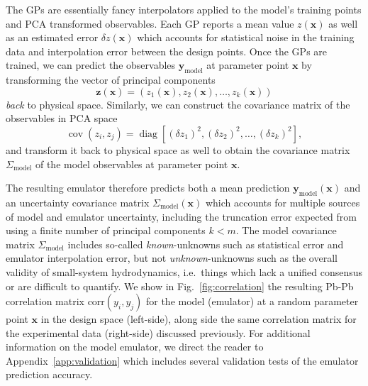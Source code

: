 \documentclass[aps,prc,reprint,amsmath,nofootinbib]{revtex4-1}
\newcommand{\xv}{\mathbf x}
\newcommand{\ym}{{\mathbf y}_\text{model}}
\newcommand{\Sigmam}{\Sigma_\text{model}}
\DeclareMathOperator{\diag}{diag}
\DeclareMathOperator{\cov}{cov}
\begin{document}
The GPs are essentially fancy interpolators applied to the model's training points and PCA transformed observables.
Each GP reports a mean value $z(\xv)$ as well as an estimated error $\delta z(\xv)$ which accounts for statistical noise in the training data and interpolation error between the design points.
Once the GPs are trained, we can predict the observables $\ym$ at parameter point $\xv$ by transforming the vector of principal components
\begin{equation}
  \mathbf{z}(\xv) = (z_1(\xv), z_2(\xv), \dots, z_k(\xv))
\end{equation}
\emph{back} to physical space.
Similarly, we can construct the covariance matrix of the observables in PCA space
\begin{equation}
  \cov(z_i, z_j) = \diag[(\delta z_{1})^2, (\delta z_2)^2, \dots, (\delta z_k)^2 ],
\end{equation}
and transform it back to physical space as well to obtain the covariance matrix $\Sigmam$ of the model observables at parameter point $\xv$.

The resulting emulator therefore predicts both a mean prediction $\ym(\xv)$ and an uncertainty covariance matrix $\Sigmam(\xv)$ which accounts for multiple sources of model and emulator uncertainty, including the truncation error expected from using a finite number of principal components $k < m$.
The model covariance matrix $\Sigmam$ includes so-called \emph{known}-unknowns such as statistical error and emulator interpolation error, but not \emph{unknown}-unknowns such as the overall validity of small-system hydrodynamics, i.e.\ things which lack a unified consensus or are difficult to quantify.
We show in Fig.~\ref{fig:correlation} the resulting Pb-Pb correlation matrix $\mathrm{corr}(y_i,y_j)$ for the model (emulator) at a random parameter point $\xv$ in the design space (left-side), along side the same correlation matrix for the experimental data (right-side) discussed previously.
For additional information on the model emulator, we direct the reader to Appendix~\ref{app:validation} which includes several validation tests of the emulator prediction accuracy.
\newpage
\end{document}
